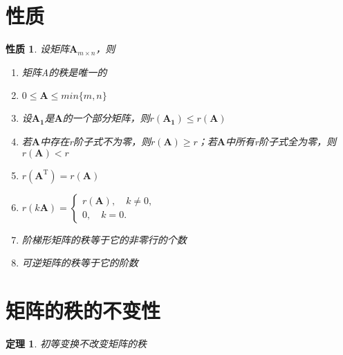 \documentclass[12pt,oneside]{ctexbook}
\newtheorem{theorem}[subsection]{定理}
\newtheorem{property}[subsection]{性质}
\begin{document}
\section{性质}
\begin{property}
    设矩阵\(\mathbf{A}_{m \times n}\)，则
    \begin{enumerate}
        \item 矩阵A的秩是唯一的
        \item \(0\leq \mathbf{A} \leq min\{m,n\}\)
        \item 设\(\mathbf{A_1}\)是\(\mathbf{A}\)的一个部分矩阵，则\(r(\mathbf{A_1}) \leq r(\mathbf{A})\)
        \item 若\(\mathbf{A}\)中存在r阶子式不为零，则\(r(\mathbf{A}) \geq r\)；若\(\mathbf{A}\)中所有r阶子式全为零，则\(r(\mathbf{A})<r\)
        \item \(r(\mathbf{A}^\mathrm{T})=r(\mathbf{A})\)
        \item \(r(k\mathbf{A})=\begin{cases}
            r(\mathbf{A}),\quad k \neq 0,
            \\0,\quad k=0.
        \end{cases}\)
        \item 阶梯形矩阵的秩等于它的非零行的个数
        \item 可逆矩阵的秩等于它的阶数
    \end{enumerate}
\end{property}

\section{矩阵的秩的不变性}
\begin{theorem}
    初等变换不改变矩阵的秩
\end{theorem}
\end{document}
